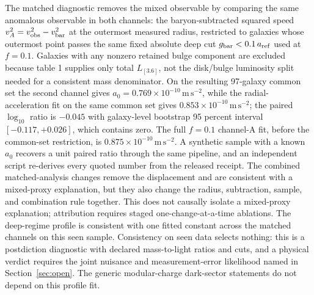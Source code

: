 \documentclass[11pt]{article}
\begin{document}
The matched diagnostic removes the mixed observable by comparing the same
anomalous observable in both channels: the baryon-subtracted squared speed
\(v_A^2=v_{\rm obs}^2-v_{\rm bar}^2\) at the outermost measured radius,
restricted to galaxies whose outermost point passes the same fixed absolute
deep cut \(g_{\rm bar}<0.1\,a_{\rm ref}\) used at \(f=0.1\). Galaxies with
any nonzero retained bulge component are excluded because table 1 supplies
only total \(L_{[3.6]}\), not the disk/bulge luminosity split needed for a
consistent mass denominator. On the resulting 97-galaxy common set the second
channel gives \(a_0=0.769\times10^{-10}\,\mathrm{m\,s^{-2}}\), while the
radial-acceleration fit on the same common set gives
\(0.853\times10^{-10}\,\mathrm{m\,s^{-2}}\); the paired \(\log_{10}\) ratio
is \(-0.045\) with galaxy-level bootstrap 95 percent interval
\([-0.117,+0.026]\), which contains zero. The full \(f=0.1\) channel-A fit,
before the common-set restriction, is
\(0.875\times10^{-10}\,\mathrm{m\,s^{-2}}\). A
synthetic sample with a known \(a_0\) recovers a unit paired ratio through
the same pipeline, and an independent script re-derives every quoted number
from the released receipt. The combined matched-analysis changes remove the
displacement and are consistent with a mixed-proxy explanation, but they also
change the radius, subtraction, sample, and combination rule together. This
does not causally isolate a mixed-proxy explanation; attribution requires
staged one-change-at-a-time ablations. The deep-regime
profile is consistent with one fitted constant across the matched channels on
this seen sample. Consistency on seen data selects nothing: this is a
postdiction diagnostic with declared mass-to-light ratios and cuts, and a
physical verdict requires the joint nuisance and measurement-error
likelihood named in Section~\ref{sec:open}. The generic modular-charge
dark-sector statements do not depend on this profile fit.
\end{document}
